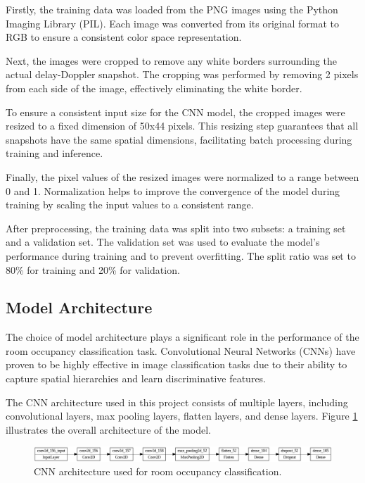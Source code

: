 \documentclass{article}
\begin{document}
Firstly, the training data was loaded from the PNG images using the Python Imaging Library (PIL). Each image was converted from its original format to RGB to ensure a consistent color space representation.

Next, the images were cropped to remove any white borders surrounding the actual delay-Doppler snapshot. The cropping was performed by removing 2 pixels from each side of the image, effectively eliminating the white border.

To ensure a consistent input size for the CNN model, the cropped images were resized to a fixed dimension of 50x44 pixels. This resizing step guarantees that all snapshots have the same spatial dimensions, facilitating batch processing during training and inference.

Finally, the pixel values of the resized images were normalized to a range between 0 and 1. Normalization helps to improve the convergence of the model during training by scaling the input values to a consistent range.

After preprocessing, the training data was split into two subsets: a training set and a validation set. The validation set was used to evaluate the model's performance during training and to prevent overfitting. The split ratio was set to 80\% for training and 20\% for validation.

\subsection{Model Architecture}
The choice of model architecture plays a significant role in the performance of the room occupancy classification task. Convolutional Neural Networks (CNNs) have proven to be highly effective in image classification tasks due to their ability to capture spatial hierarchies and learn discriminative features.

The CNN architecture used in this project consists of multiple layers, including convolutional layers, max pooling layers, flatten layers, and dense layers. Figure \ref{fig:architecture} illustrates the overall architecture of the model.

\begin{figure}
    \centering
    \includegraphics[width=1\textwidth]{model_plot.png}
    \caption{CNN architecture used for room occupancy classification.}
    \label{fig:architecture}
\end{figure}
\end{document}
